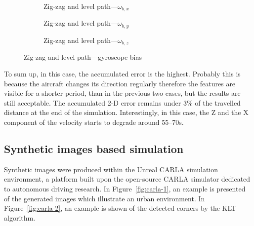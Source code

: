 \begin{figure}[H]
    \centering
    \begin{subfigure}{0.3\textwidth}
        
        \caption{Zig-zag and level path---$\omega_{b,x}$}
    \end{subfigure}
    \hfill
    \begin{subfigure}{0.3\textwidth}
        
        \caption{Zig-zag and level path---$\omega_{b,y}$}
    \end{subfigure}
    \hfill
    \begin{subfigure}{0.3\textwidth}
        
        \caption{Zig-zag and level path---$\omega_{b,z}$}
    \end{subfigure}
    \caption{Zig-zag and level path---gyroscope bias}\label{fig:zig-zag-level-gbias}
\end{figure}

To sum up, in this case, the accumulated error is the highest. Probably this is because the aircraft changes its direction regularly therefore the features are visible for a shorter period, than in the previous two cases, but the results are still acceptable. The accumulated 2-D error remains under 3\% of the travelled distance at the end of the simulation. Interestingly, in this case, the Z and the X component of the velocity starts to degrade around 55--70\si{\second}.

\subsection{Synthetic images based simulation}

Synthetic images were produced within the Unreal CARLA simulation environment, a platform built upon the open-source CARLA simulator dedicated to autonomous driving research. In Figure~\ref{fig:carla-1}, an example is presented of the generated images which illustrate an urban environment. In Figure~\ref{fig:carla-2}, an example is shown of the detected corners by the KLT algorithm.

